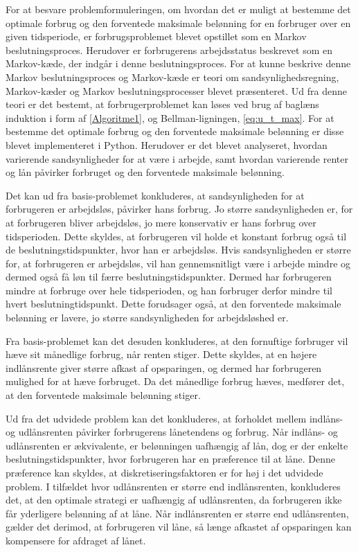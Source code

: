 For at besvare problemformuleringen, om hvordan det er muligt at bestemme det optimale forbrug og den forventede maksimale belønning for en forbruger over en given tidsperiode, er forbrugsproblemet blevet opstillet som en Markov beslutningsproces. Herudover er forbrugerens arbejdsstatus beskrevet som en Markov-kæde, der indgår i denne beslutningsproces. For at kunne beskrive denne Markov beslutningsproces og Markov-kæde er teori om sandsynlighedsregning, Markov-kæder og Markov beslutningsprocesser blevet præsenteret. Ud fra denne teori er det bestemt, at forbrugerproblemet kan løses ved brug af baglæns induktion i form af \autoref{Algoritme1}, og Bellman-ligningen, \autoref{eq:u_t_max}. For at bestemme det optimale forbrug og den forventede maksimale belønning er disse blevet implementeret i Python. Herudover er det blevet analyseret, hvordan varierende sandsynligheder for at være i arbejde, samt hvordan varierende renter og lån påvirker forbruget og den forventede maksimale belønning. 

Det kan ud fra basis-problemet konkluderes, at sandsynligheden for at forbrugeren er arbejdsløs, påvirker hans forbrug. Jo større sandsynligheden er, for at forbrugeren bliver arbejdsløs, jo mere konservativ er hans forbrug over tidsperioden. Dette skyldes, at forbrugeren vil holde et konstant forbrug også til de beslutningstidspunkter, hvor han er arbejdsløs. Hvis sandsynligheden er større for, at forbrugeren er arbejdsløs, vil han gennemsnitligt være i arbejde mindre og dermed også få løn til færre beslutningstidspunkter. Dermed har forbrugeren mindre at forbruge over hele tidsperioden, og han forbruger derfor mindre til hvert beslutningtidspunkt. Dette forudsager også, at den forventede maksimale belønning er lavere, jo større sandsynligheden for arbejdsløshed er.

Fra basis-problemet kan det desuden konkluderes, at den fornuftige forbruger vil hæve sit månedlige forbrug, når renten stiger. Dette skyldes, at en højere indlånsrente giver større afkast af opsparingen, og dermed har forbrugeren mulighed for at hæve forbruget. Da det månedlige forbrug hæves, medfører det, at den forventede maksimale belønning stiger.

Ud fra det udvidede problem kan det konkluderes, at forholdet mellem indlåns- og udlånsrenten påvirker forbrugerens lånetendens og forbrug. Når indlåns- og udlånsrenten er ækvivalente, er belønningen uafhængig af lån, dog er der enkelte beslutningstidspunkter, hvor forbrugeren har en præference til at låne. Denne præference kan skyldes, at diskretiseringsfaktoren er for høj i det udvidede problem. I tilfældet hvor udlånsrenten er større end indlånsrenten, konkluderes det, at den optimale strategi er uafhængig af udlånsrenten, da forbrugeren ikke får yderligere belønning af at låne. Når indlånsrenten er større end udlånsrenten, gælder det derimod, at forbrugeren vil låne, så længe afkastet af opsparingen kan kompensere for afdraget af lånet. 

